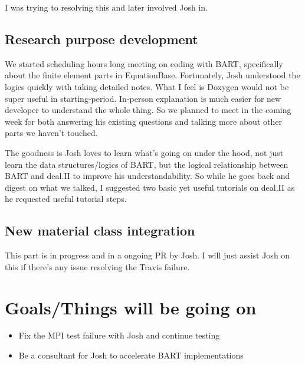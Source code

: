 \documentclass{article}
\begin{document}
I was trying to resolving this and later involved Josh in.

\subsection{Research purpose development}
We started scheduling hours long meeting on coding with BART, specifically about the finite 
element parts in EquationBase. Fortunately, Josh understood the logics quickly with taking detailed notes. What I feel is Doxygen would not be super useful
in starting-period. In-person explanation is much easier for new developer to understand
the whole thing. 
So we planned to meet in the coming week for both answering his existing
questions and talking more about other parts we haven't touched. 

The goodness is Josh loves to learn what's going on under the hood, not just learn the
data structures/logics of BART, but the logical relationship between BART and deal.II to
improve his understandability. So while he goes back and digest on what we talked, I suggested
two basic yet useful tutorials on deal.II as he requested useful tutorial steps.


\subsection{New material class integration}
This part is in progress and in a ongoing PR by Josh. I will just assist Josh on this if there's
any issue resolving the Travis failure.



\section{Goals/Things will be going on}
\begin{itemize}
	\item Fix the MPI test failure with Josh and continue testing
	\item Be a consultant for Josh to accelerate BART implementations
\end{itemize}
\end{document}
